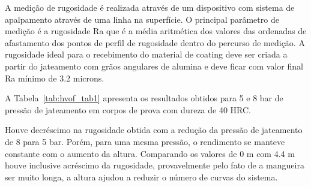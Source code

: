 A medição de rugosidade é realizada através de um dispositivo com sistema de
apalpamento através de uma linha na superfície. O principal parâmetro de
medição é a rugosidade Ra que é a média aritmética dos valores das ordenadas de
afastamento dos pontos de perfil de rugosidade dentro do percurso de medição. A
rugosidade ideal para o recebimento do material de coating deve ser criada a
partir do jateamento com grãos angulares de alumina e deve ficar com valor
final Ra mínimo de 3.2 microns.

A Tabela~\ref{tab:hvof_tab1} apresenta os resultados obtidos para 5 e
8 bar de pressão de jateamento em corpos de prova com dureza de 40 HRC.

Houve decréscimo na rugosidade obtida com a redução da pressão de jateamento de
8 para 5 bar. Porém, para uma mesma pressão, o rendimento se manteve constante
com o aumento da altura. Comparando os valores de 0 m com 4.4 m houve inclusive
acréscimo da rugosidade, provavelmente pelo fato de a mangueira ser muito
longa, a altura ajudou a reduzir o número de curvas do sistema. 

